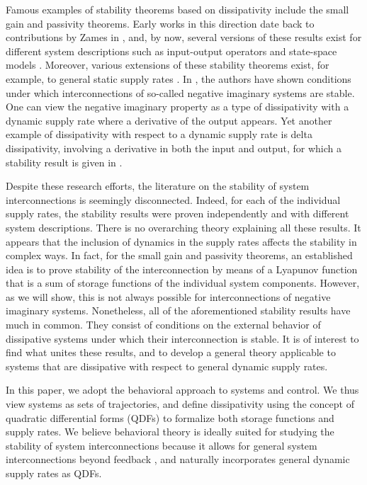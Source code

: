 \documentclass[letterpaper, 10 pt, conference]{ieeeconf}
\theoremstyle{ieeeconf}
\begin{document}
Famous examples of stability theorems based on dissipativity include the small gain and passivity theorems. Early works in this direction date back to contributions by Zames in \cite{zames_input-output_1966}, and, by now, several versions of these results exist for different system descriptions such as input-output operators and state-space models \cite{desoer_feedback_2009,van_der_schaft_dissipative_2017}.  
Moreover, various extensions of these stability theorems exist, for example, to general static supply rates \cite{arcak_stability_2016,van_der_schaft_dissipative_2017}.  
In \cite{xiong_negative_2010}, the authors have shown conditions under which interconnections of so-called negative imaginary systems are stable. One can view the negative imaginary property as a type of dissipativity with a dynamic supply rate where a derivative of the output appears. Yet another example of dissipativity with respect to a dynamic supply rate is delta dissipativity, involving a derivative in both the input and output, for which a stability result is given in \cite{schweidel_compositional_2022}. 

Despite these research efforts, the literature on the stability of system interconnections is seemingly disconnected. Indeed, for each of the individual supply rates, the stability results were proven independently and with different system descriptions. There is no overarching theory explaining all these results. It appears that the inclusion of dynamics in the supply rates affects the stability in complex ways. In fact, for the small gain and passivity theorems, an established idea is to prove stability of the interconnection by means of a Lyapunov function that is a sum of storage functions of the individual system components. However, as we will show, this is not always possible for interconnections of negative imaginary systems. Nonetheless, all of the aforementioned stability results have much in common. They consist of conditions on the external behavior of dissipative systems under which their interconnection is stable. It is of interest to find what unites these results, and to develop a general theory applicable to systems that are dissipative with respect to general dynamic supply rates.

In this paper, we adopt the behavioral approach \cite{willems_time_1986I,willems_time_1986II,polderman_introduction_1998} to systems and control. We thus view systems as sets of trajectories, and define dissipativity using the concept of quadratic differential forms (QDFs) \cite{willems_quadratic_1998} to formalize both storage functions and supply rates. We believe behavioral theory is ideally suited for studying the stability of system interconnections because it allows for general system interconnections beyond feedback \cite{willems_interconnections_1997}, and naturally incorporates general dynamic supply rates as QDFs.
\end{document}

